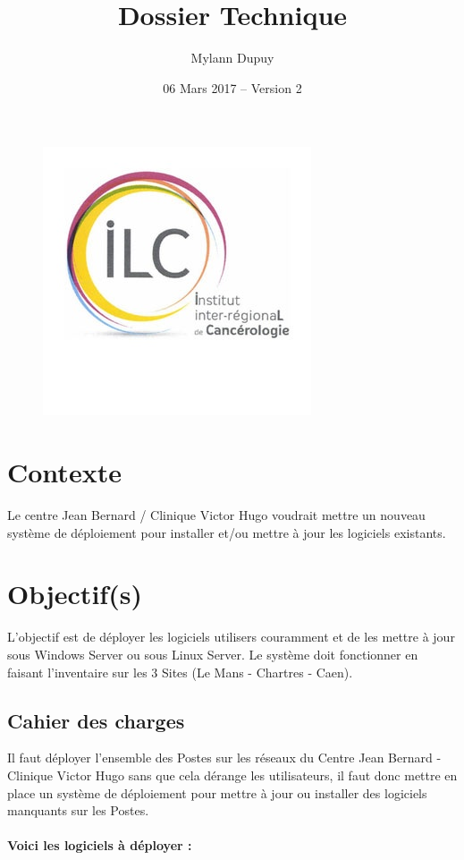 \documentclass[11pt,a4paper,oneside]{article}
\author{Mylann Dupuy}
\title{Dossier Technique}
\date{06 Mars 2017 -- Version 2}
\begin{document}
\maketitle
\begin{figure}[hbtp]
\centering
\includegraphics[scale=1]{Script/cjb.jpg}
\end{figure}
\newpage
\tableofcontents
\newpage
\setcounter{page}{3}
\section{Contexte}
Le centre Jean Bernard / Clinique Victor Hugo voudrait mettre un nouveau système de déploiement pour installer et/ou mettre à jour les logiciels existants.

\section{Objectif(s)}
L'objectif est de déployer les logiciels utilisers couramment et de les mettre à jour sous Windows Server ou sous Linux Server. Le système doit fonctionner en faisant l'inventaire sur les 3 Sites (Le Mans - Chartres - Caen). 

\subsection{Cahier des charges}
Il faut déployer l'ensemble des Postes sur les réseaux du Centre Jean Bernard - Clinique Victor Hugo sans que cela dérange les utilisateurs, il faut donc mettre en place un système de déploiement pour mettre à jour ou installer des logiciels manquants sur les Postes.\\ \\
\textbf{Voici les logiciels à déployer :}\\
\end{document}
